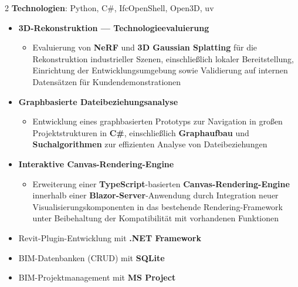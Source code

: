 \documentclass[10pt,a4paper,withhyper]{../altacv}
\begin{document}
\begin{paracol}{2}
  \textbf{Technologien}: Python, C\#, IfcOpenShell, Open3D, uv

  \vspace{0.5em}


  \vspace{0.5em}

  \begin{itemize}
    \item \textbf{3D-Rekonstruktion — Technologieevaluierung}
          \begin{itemize}
            \item Evaluierung von \textbf{NeRF} und \textbf{3D Gaussian Splatting} für die Rekonstruktion industrieller Szenen, einschließlich lokaler Bereitstellung, Einrichtung der Entwicklungsumgebung sowie Validierung auf internen Datensätzen für Kundendemonstrationen
          \end{itemize}
    \item \textbf{Graphbasierte Dateibeziehungsanalyse}
          \begin{itemize}
            \item Entwicklung eines graphbasierten Prototyps zur Navigation in großen Projektstrukturen in \textbf{C\#}, einschließlich \textbf{Graphaufbau} und \textbf{Suchalgorithmen} zur effizienten Analyse von Dateibeziehungen
          \end{itemize}
    \item \textbf{Interaktive Canvas-Rendering-Engine}
          \begin{itemize}
            \item Erweiterung einer \textbf{TypeScript}-basierten \textbf{Canvas-Rendering-Engine} innerhalb einer \textbf{Blazor-Server}-Anwendung durch Integration neuer Visualisierungskomponenten in das bestehende Rendering-Framework unter Beibehaltung der Kompatibilität mit vorhandenen Funktionen
          \end{itemize}
  \end{itemize}




  \begin{itemize}
    \item Revit-Plugin-Entwicklung mit \textbf{.NET Framework}
    \item BIM-Datenbanken (CRUD) mit \textbf{SQLite}
    \item BIM-Projektmanagement mit \textbf{MS Project}
  \end{itemize}


\end{paracol}
\end{document}
